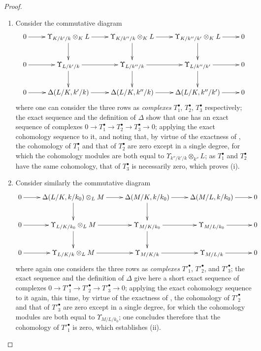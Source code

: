 \begin{proof}
\begin{enumerate}
  \item[(i)] Consider the commutative diagram
  \[
    \xymatrix{
      0\ar[r] & \Upsilon_{K/k'/k}\otimes_K L\ar[r]\ar[d] & \Upsilon_{K/k''/k}\otimes_K L\ar[r]\ar[d] & \Upsilon_{K/k''/k'}\otimes_K L\ar[r]\ar[d] & 0\\
      0\ar[r] & \Upsilon_{L/k'/k}\ar[r]\ar[d] & \Upsilon_{L/k''/k}\ar[r]\ar[d] & \Upsilon_{L/k''/k'}\ar[r]\ar[d] & 0\\
      0\ar[r] & \Delta(L/K,k'/k)\ar[r] & \Delta(L/K,k''/k)\ar[r] & \Delta(L/K,k''/k')\ar[r] & 0
    }
  \]
  where one can consider the three rows as \emph{complexes} $T^\bullet_1$, $T^\bullet_2$, $T^\bullet_3$ respectively; the exact sequence  and the definition of $\Delta$  show that one has an exact sequence of complexes $0\to T^\bullet_1\to T^\bullet_2\to T^\bullet_3\to 0$; applying the exact cohomology sequence to it, and noting that, by virtue of the exactness of , the cohomology of $T^\bullet_1$ and that of $T^\bullet_2$ are zero except in a single degree, for which the cohomology modules are both equal to $\Upsilon_{k''/k'/k}\otimes_{k''}L$; as $T^\bullet_1$ and $T^\bullet_2$ have the same cohomology, that of $T^\bullet_3$ is necessarily zero, which proves (i).
  \item[(ii)] Consider similarly the commutative diagram
  \[
    \xymatrix{
      0\ar[r] & \Delta(L/K,k/k_0)\otimes_L M\ar[r]\ar[d] & \Delta(M/K,k/k_0)\ar[r]\ar[d] & \Delta(M/L,k/k_0)\ar[r] & 0\\
      0\ar[r] & \Upsilon_{L/K/k_0}\otimes_L M\ar[r]\ar[d] & \Upsilon_{M/K/k_0}\ar[r]\ar[d] & \Upsilon_{M/L/k_0}\ar[r] & 0\\
      0\ar[r] & \Upsilon_{L/K/k}\otimes_L M\ar[r] & \Upsilon_{M/K/k}\ar[r] & \Upsilon_{M/L/k}\ar[r] & 0
    }
  \]
  where again one considers the three rows as \emph{complexes} $T'^\bullet_1$, $T'^\bullet_2$, and $T'^\bullet_3$; the exact sequence  and the definition of $\Delta$  give here a short exact sequence of complexes $0\to T'^\bullet_1\to T'^\bullet_2\to T'^\bullet_3\to 0$; applying the exact cohomology sequence to it again, this time, by virtue of the exactness of , the cohomology of $T'^\bullet_2$ and that of $T'^\bullet_3$ are zero except in a single degree, for which the cohomology modules are both equal to $\Upsilon_{M/L/k_0}$; one concludes therefore that the cohomology of $T'^\bullet_1$ is zero, which establishes (ii).
\end{enumerate}
\end{proof}

